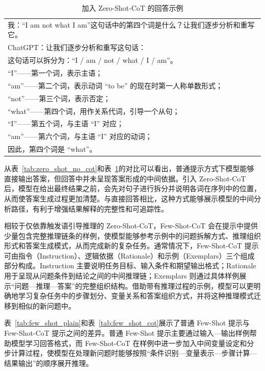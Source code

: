 \begin{table}[htbp]
  \centering
  \caption{加入 Zero-Shot-CoT 的回答示例}
  \label{tab:zero_shot_with_cot}
  {\small
  \begin{tabular}{p{}}
    \toprule
    我：“I am not what I am”这句话中的第四个词是什么？让我们逐步分析和重写它。 \\[4pt]
    ChatGPT：让我们逐步分析和重写这句话：\\
    这句话可以拆分为：``I / am / not / what / I / am''。\\
    “I”——第一个词，表示主语；\\
    “am”——第二个词，表示动词 ``to be'' 的现在时第一人称单数形式；\\
    “not”——第三个词，表示否定；\\
    “what”——第四个词，用作关系代词，引导一个从句；\\
    “I”——第五个词，与主语 ``I'' 对应；\\
    “am”——第六个词，与主语 ``I'' 对应的动词；\\
    因此，第四个词是 ``what''。 \\
    \bottomrule
  \end{tabular}}
\end{table}

从表~\ref{tab:zero_shot_no_cot}和表~\ref{tab:zero_shot_with_cot}的对比可以看出，普通提示方式下模型能够直接输出答案，但回答中并未呈现答案形成的中间依据。引入 Zero-Shot-CoT 后，模型在给出最终结果之前，会先对句子进行拆分并说明各词在序列中的位置，从而使答案生成过程更加清楚。与直接回答相比，这种方式能够展示模型的中间分析路径，有利于增强结果解释的完整性和可追踪性。

相较于仅依靠触发语引导推理的 Zero-Shot-CoT，Few-Shot-CoT 会在提示中提供少量包含完整推理链条的样例，使模型能够参考示例中的问题拆解方式、推理组织形式和答案生成模式，从而完成新的复杂任务。通常情况下，Few-Shot-CoT 提示可由指令（Instruction）、逻辑依据（Rationale）和示例（Exemplars）三个组成部分构成。Instruction 主要说明任务目标、输入条件和期望输出格式；Rationale 用于呈现从问题条件到结论之间的中间推理链；Exemplars 则通过具体样例展示“问题—推理—答案”的完整组织结构。借助带有推理过程的示例，模型可以更明确地学习复杂任务中的步骤划分、变量关系和答案组织方式，并将这种推理模式迁移到相似的新问题中。

表~\ref{tab:few_shot_plain}和表~\ref{tab:few_shot_cot}展示了普通 Few-Shot 提示与 Few-Shot-CoT 提示之间的差异。普通 Few-Shot 提示主要通过输入—输出样例帮助模型学习回答格式，而 Few-Shot-CoT 在样例中进一步加入中间变量设定和分步计算过程，使模型在处理新问题时能够按照“条件识别—变量表示—步骤计算—结果输出”的顺序展开推理。

